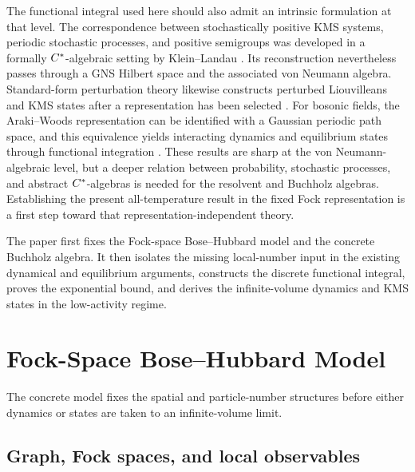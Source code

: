\documentclass[11pt,a4paper]{article}
\theoremstyle{plain}
\theoremstyle{definition}
\theoremstyle{remark}
\begin{document}
The functional integral used here should also admit an intrinsic formulation at that level. The correspondence between stochastically positive KMS systems, periodic stochastic processes, and positive semigroups was developed in a formally \(C^{\ast}\)-algebraic setting by Klein--Landau \cite[Sections 1 and 6--8]{KleinLandau001}. Its reconstruction nevertheless passes through a GNS Hilbert space and the associated von Neumann algebra. Standard-form perturbation theory likewise constructs perturbed Liouvilleans and KMS states after a representation has been selected \cite{DerezinskiJaksicPillet001}. For bosonic fields, the Araki--Woods representation can be identified with a Gaussian periodic path space, and this equivalence yields interacting dynamics and equilibrium states through functional integration \cite[Sections 17.1.5 and 21.4--21.5]{DerezinskiGerard001}. These results are sharp at the von Neumann-algebraic level, but a deeper relation between probability, stochastic processes, and abstract \(C^{\ast}\)-algebras is needed for the resolvent and Buchholz algebras. Establishing the present all-temperature result in the fixed Fock representation is a first step toward that representation-independent theory.

The paper first fixes the Fock-space Bose--Hubbard model and the concrete Buchholz algebra. It then isolates the missing local-number input in the existing dynamical and equilibrium arguments, constructs the discrete functional integral, proves the exponential bound, and derives the infinite-volume dynamics and KMS states in the low-activity regime.

\section{Fock-Space Bose--Hubbard Model}\label{fock-space-bosehubbard-model}

The concrete model fixes the spatial and particle-number structures before either dynamics or states are taken to an infinite-volume limit.

\subsection{Graph, Fock spaces, and local observables}\label{graph-fock-spaces-and-local-observables}
\end{document}
